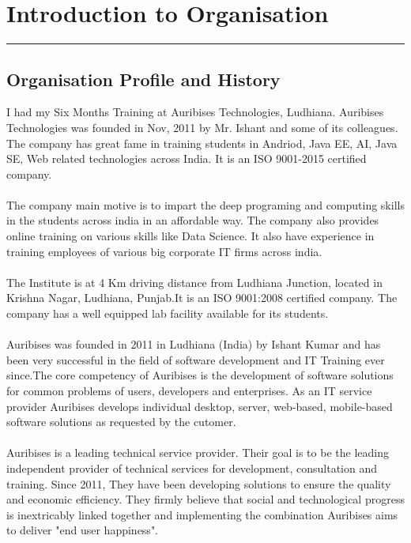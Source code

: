 \chapter{Introduction to Organisation}\hrule
\label{Chapter:1}
\section {Organisation Profile and History}

I had my Six Months Training at Auribises Technologies, Ludhiana. Auribises Technologies was founded in Nov, 2011 by Mr. Ishant and some of its colleagues. The company has great fame in training students in Andriod, Java EE, AI, Java SE, Web related technologies across India. It is an ISO 9001-2015 certified company.
\\
\\
The company main motive is to impart the deep programing and computing skills in the students across india in an affordable way. The company also provides online training on various skills like Data Science. It also have experience in training employees of various big corporate IT firms across india.\\
\\
The Institute is at 4 Km driving distance from Ludhiana Junction, located in Krishna Nagar, Ludhiana, Punjab.It is an ISO 9001:2008 certified company. The company has a well equipped lab facility available for its students.
\\
\\
Auribises was founded in 2011 in Ludhiana (India) by Ishant Kumar and has been very successful in the field of software development and IT Training ever since.The core competency of Auribises is the development of software solutions for common problems of users, developers and enterprises. As an IT service provider Auribises develops individual desktop, server, web-based, mobile-based software solutions as requested by the cutomer.
\\
\\
Auribises is a leading technical service provider. Their goal is to be the leading independent provider of technical services for development, consultation and training. Since 2011, They have been developing solutions to ensure the quality and economic efficiency. They firmly believe that social and technological progress is inextricably linked together and implementing the combination Auribises aims to deliver "end user happiness".
